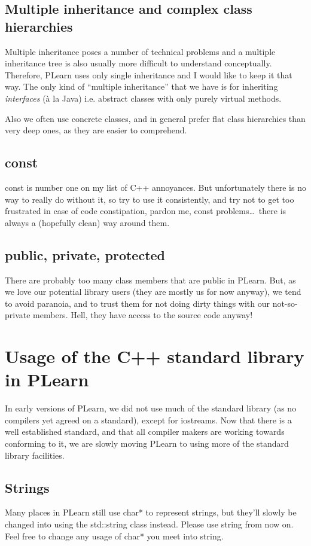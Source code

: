 \documentclass[11pt]{book}
\begin{document}
\subsection*{Multiple inheritance and complex class hierarchies}
 Multiple inheritance poses a number of technical problems and a multiple
inheritance tree is also usually more difficult to understand
conceptually. Therefore, PLearn uses only single inheritance and I would
like to keep it that way. The only kind of ``multiple inheritance'' that we
have is for inheriting \emph{interfaces } (\`a la Java) i.e. abstract
classes with only purely virtual methods.

Also we often use concrete classes, and in general prefer flat class
hierarchies than very deep ones, as they are easier to comprehend.


\subsection*{const}
 const is number one on my list of C++ annoyances. But unfortunately
there is no way to really do without it, so try to use it consistently,
and try not to get too frustrated in case of code constipation,
pardon me, const problems\ldots\ there is always a (hopefully clean)
way around them.


\subsection*{public, private, protected}
 There are probably too many class members that are public in
PLearn. But, as we love our potential library users (they are mostly
us for now anyway), we tend to avoid paranoia, and to trust them
for not doing dirty things with our not-so-private members. Hell,
they have access to the source code anyway!

\section{Usage of the C++ standard library in PLearn} 

 In early versions of PLearn, we did not use much of the standard
library (as no compilers yet agreed on a standard), except for
iostreams. Now that there is a well established standard, and that
all compiler makers are working towards conforming to it, we are
slowly moving PLearn to using more of the standard library facilities.


\subsection*{Strings}
 Many places in PLearn still use char* to represent strings,
but they'll slowly be changed into using the std::string class
instead. Please use string from now on. Feel free to change any usage
of char* you meet into string.
\end{document}
